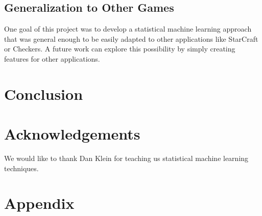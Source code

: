 \documentclass[11pt]{article}
\begin{document}
\subsection{Generalization to Other Games}
One goal of this project was to develop a statistical machine learning approach that was general enough to be easily adapted to other applications like StarCraft or Checkers. A future work can explore this possibility by simply creating features for other applications.

\section{Conclusion}

\section{Acknowledgements}
We would like to thank Dan Klein for teaching us statistical machine learning techniques.
\section*{Appendix}



\end{document}
